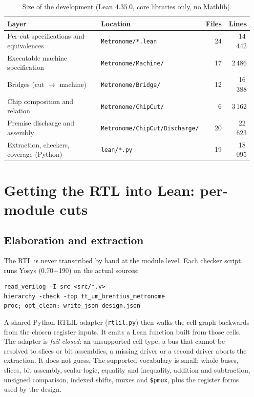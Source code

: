 \documentclass[11pt,a4paper]{article}
\newcommand{\brkus}{\textunderscore\allowbreak}
\newcommand{\code}[1]{{\let\_\brkus\texttt{#1}}}
\newcommand{\lean}[1]{\texttt{\detokenize{#1}}}
\begin{document}
\begin{table}[!ht]
\centering\small
\begin{tabular}{@{}llrr@{}}
\toprule
Layer & Location & Files & Lines \\
\midrule
Per-cut specifications and equivalences & \code{Metronome/*.lean} & 24 & 14\,442 \\
Executable machine specification & \code{Metronome/Machine/} & 17 & 2\,486 \\
Bridges (cut $\to$ machine) & \code{Metronome/Bridge/} & 12 & 16\,388 \\
Chip composition and relation & \code{Metronome/ChipCut/} & 6 & 3\,162 \\
Premise discharge and assembly & \code{Metronome/ChipCut/Discharge/} & 20 & 22\,623 \\
\midrule
Extraction, checkers, coverage (Python) & \code{lean/*.py} & 19 & 18\,095 \\
\bottomrule
\end{tabular}
\caption{Size of the development (Lean 4.35.0, core libraries only, no Mathlib).}
\end{table}

\section{Getting the RTL into Lean: per-module cuts}
\label{sec:cuts}

\subsection{Elaboration and extraction}

The RTL is never transcribed by hand at the module level. Each checker script
runs Yosys (0.70+190) on the actual sources:
\begin{lstlisting}[language={}]
read_verilog -I src <src/*.v>
hierarchy -check -top tt_um_brentius_metronome
proc; opt_clean; write_json design.json
\end{lstlisting}
A shared Python RTLIL adapter (\code{rtlil.py}) then walks the cell graph
backwards from the chosen register inputs. It emits a Lean function
\lean{rtlStep : State -> Input -> State} built from those cells. The adapter
is \emph{fail-closed}: an unsupported cell type, a bus that cannot be resolved
to slices or bit assemblies, a missing driver or a second driver aborts the
extraction. It does not guess. The supported vocabulary is small: whole buses,
slices, bit assembly, scalar logic, equality and inequality, addition and
subtraction, unsigned comparison, indexed shifts, muxes and \code{\$pmux}, plus
the register forms used by the design.
\end{document}

